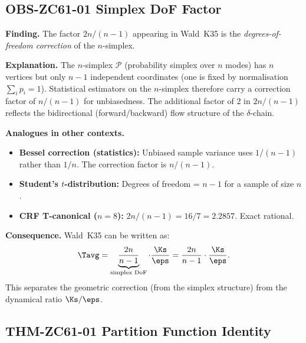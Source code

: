 \documentclass[12pt, a4paper]{article}
\begin{document}
\subsection{OBS-ZC61-01 \quad Simplex DoF Factor}
\label{sec:obs01}


\begin{derivedbox}[title={OBS-ZC61-01: Factor $2n/(n{-}1)$
  as Simplex DoF Correction ($R_0$, Structural)}]

\textbf{Finding.}
The factor $2n/(n{-}1)$ appearing in Wald~K35 is the
\emph{degrees-of-freedom correction} of the $n$-simplex.

\textbf{Explanation.}
The $n$-simplex $\mathcal{P}$ (probability simplex over
$n$ modes) has $n$ vertices but only $n{-}1$ independent
coordinates (one is fixed by normalisation
$\sum_i p_i = 1$).
Statistical estimators on the $n$-simplex therefore carry
a correction factor of $n/(n{-}1)$ for unbiasedness.
The additional factor of 2 in $2n/(n{-}1)$ reflects the
bidirectional (forward/backward) flow structure of the
$\delta$-chain.

\textbf{Analogues in other contexts.}
\begin{itemize}[leftmargin=2em, noitemsep]
  \item \textbf{Bessel correction (statistics):}
    Unbiased sample variance uses $1/(n{-}1)$ rather
    than $1/n$. The correction factor is $n/(n{-}1)$.
  \item \textbf{Student's $t$-distribution:}
    Degrees of freedom = $n{-}1$ for a sample of size $n$.
  \item \textbf{CRF T-canonical ($n=8$):}
    $2n/(n{-}1) = 16/7 = 2.2857$. Exact rational.
\end{itemize}

\textbf{Consequence.}
Wald~K35 can be written as:
\[
  \Tavg = \underbrace{\frac{2n}{n-1}}_{\text{simplex DoF}} \cdot
  \frac{\Ks}{\eps}
  = \frac{2n}{n-1} \cdot \frac{\Ks}{\eps}.
\]
This separates the geometric correction (from the
simplex structure) from the dynamical ratio $\Ks/\eps$.
\end{derivedbox}

\subsection{THM-ZC61-01 \quad Partition Function Identity}
\label{sec:thm01}
\end{document}
